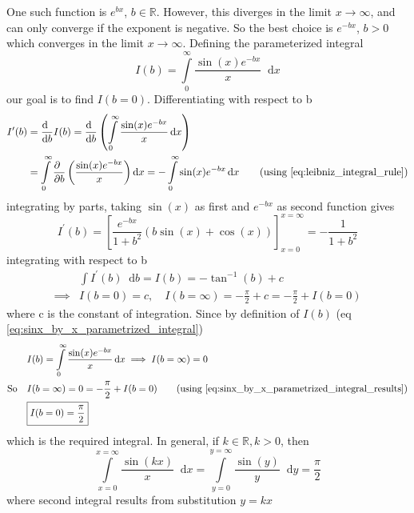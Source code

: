\documentclass[11pt, a4paper]{article}
\newcommand{\primed}[1]{#1^{\prime}}
\newcommand{\diff}{\mathop{}\!\mathrm{d}}
\newcommand{\dx}{\diff x}
\newcommand{\dy}{\diff y}
\newcommand{\derv}[1]{\frac{\diff \hfill}{\diff #1}}	%
\newcommand{\dervb}[2]{\derv{#1} \left(#2\right)}  %
\newcommand{\pdiff}{\mathop{}\!\mathrm{\partial}} %
\newcommand{\pderv}[1]{\frac{\pdiff \hfill}{\pdiff #1}}	%
\newcommand{\pdervb}[2]{\pderv{#1} \left(#2\right)}  %
\newcommand{\dint}[2]{\int \limits_{#1}^{#2}}  %
\newcommand{\intzerotoinfty}{\dint{0}{\infty}}	%
\begin{document}
One such function is $e^{bx}$, $b \in \mathbb{R}$. However, this diverges in the limit $x \to \infty$, and can only converge if the exponent is negative. So the best choice is $e^{-bx}$, $b > 0$ which converges in the limit $x \to \infty$. Defining the parameterized integral
\begin{equation}\label{eq:sinx_by_x_parametrized_integral}
	I(b) = \intzerotoinfty \frac{\sin(x) e^{-bx}}{x} \dx
\end{equation}
our goal is to find $I(b=0)$. Differentiating with respect to b
\begin{align*}
	\primed{I}(b) & = \derv{b}I(b) = \dervb{b}{\intzerotoinfty \frac{\sin(x) e^{-bx}}{x} \dx} \\
	& = \intzerotoinfty \pdervb{b}{\frac{\sin(x) e^{-bx}}{x}} \dx = -\intzerotoinfty \sin(x) e^{-bx} \dx \tag{using \eqref{eq:leibniz_integral_rule}}
\end{align*}
integrating by parts, taking $\sin(x)$ as first and $e^{-bx}$ as second function gives
\begin{equation*}
	\primed{I}(b) = \left[\frac{e^{-bx}}{1 + b^{2}} \left(b\sin(x) + \cos(x)\right)\right]_{x=0}^{x=\infty} = -\frac{1}{1 + b^{2}}
\end{equation*}
integrating with respect to b
\begin{align}
	& \int \primed{I}(b) \diff b = I(b) = -\tan^{-1}(b) + c \nonumber \\
	\implies & I(b=0) = c, \quad I(b=\infty) = -\frac{\pi}{2} + c = -\frac{\pi}{2} + I(b=0) \label{eq:sinx_by_x_parametrized_integral_results}
\end{align}
where c is the constant of integration. Since by definition of $I(b)$ (eq \eqref{eq:sinx_by_x_parametrized_integral})
\begin{align*}
	& I(b) = \intzerotoinfty \frac{\sin(x) e^{-bx}}{x} \dx \implies I(b=\infty) = 0 \\
	\text{So} \quad & I(b=\infty) = 0 = -\frac{\pi}{2} + I(b=0) \tag{using \eqref{eq:sinx_by_x_parametrized_integral_results}} \\
	& \boxed{I(b=0) = \frac{\pi}{2}}
\end{align*}
which is the required integral. In general, if $k \in \mathbb{R}, k > 0$, then
\begin{equation}\label{eq:int_sinkx_by_x}
\int \limits_{x=0}^{x=\infty} \frac{\sin(kx)}{x} \dx = \int \limits_{y=0}^{y=\infty} \frac{\sin(y)}{y} \dy = \frac{\pi}{2}
\end{equation}
where second integral results from substitution $y=kx$
\end{document}
